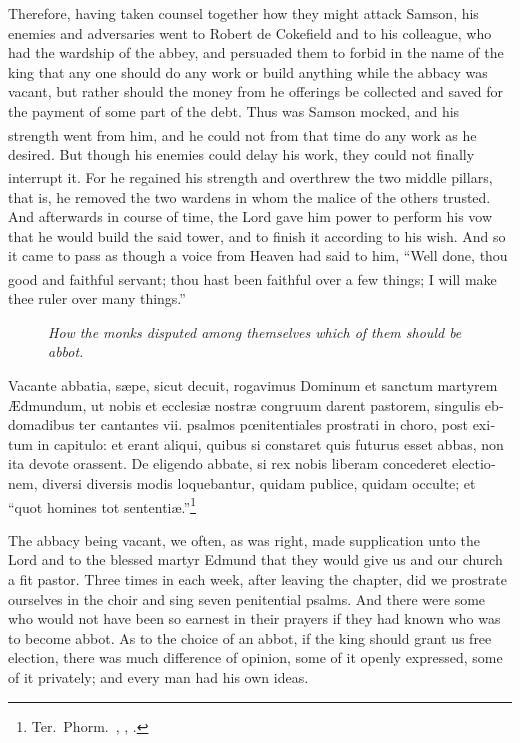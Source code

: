 \documentclass[10pt]{book}
\newcounter{engnote}
\newcommand{\engnotenum}{\textsuperscript{\arabic{engnote}\stepcounter{engnote}}}
\newcommand{\blockhead}[4][]{
\begin{figure}
\centering
\vspace{#4}
\parbox{2.75cm}{\begin{center}\footnotesize \color{BrickRed} \emph{#2}\\ #1 \end{center}}
\end{figure}
}
\begin{document}
\begin{paracol}{2}
Therefore, having taken counsel together how they might attack Samson, his enemies and adversaries went to Robert de Cokefield and to his colleague, who had the wardship of the abbey, and persuaded them to forbid in the name of the king that any one should do any work or build anything while the abbacy was vacant, but rather should the money from he offerings be collected and saved for the payment of some part of the debt. Thus was Samson mocked, and his strength went from him,\engnotenum{} and he could not from that time do any work as he desired. But though his enemies could delay his work, they could not finally interrupt it. For he regained his strength and overthrew the two middle pillars,\engnotenum{} that is, he removed the two wardens in whom the malice of the others trusted. And afterwards in course of time, the Lord gave him power to perform his vow that he would build the said tower, and to finish it according to his wish. And so it came to pass as though a voice from Heaven had said to him, ``Well done, thou good and faithful servant;\engnotenum{} thou hast been faithful over a few things; I will make thee ruler over many things.''

\switchcolumn*

\begin{otherlanguage}{latin}
\blockhead{How the monks disputed among themselves which of them should be abbot.}{4}{-0.45cm}
Vacante abbatia, s\ae{}pe, sicut decuit, rogavimus Dominum et sanctum martyrem \AE{}dmundum, ut nobis et ecclesi\ae{} nostr\ae{} congruum darent pastorem, singulis ebdomadibus ter cantantes vii. psalmos p\oe{}nitentiales prostrati in choro, post exitum in capitulo: et erant aliqui, quibus si constaret quis futurus esset abbas, non ita devote orassent. De eligendo abbate, si rex nobis liberam concederet electionem, diversi diversis modis loquebantur, quidam publice, quidam occulte; et ``quot homines tot sententi\ae{}.''\footnote[\textdagger]{Ter.\ Phorm.\ , , .}

\end{otherlanguage}

\switchcolumn

The abbacy being vacant, we often, as was right, made supplication unto the Lord and to the blessed martyr Edmund that they would give us and our church a fit pastor. Three times in each week, after leaving the chapter, did we prostrate ourselves in the choir and sing seven penitential psalms. And there were some who would not have been so earnest in their prayers if they had known who was to become abbot. As to the choice of an abbot, if the king should grant us free election, there was much difference of opinion, some of it openly expressed, some of it privately; and every man had his own ideas.


\end{paracol}
\end{document}
